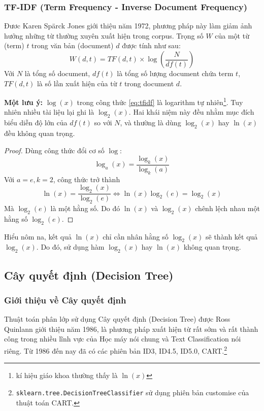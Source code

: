 \documentclass[12pt]{article}
\begin{document}
\subsubsection{TF-IDF (Term Frequency - Inverse Document Frequency)}
Đươc Karen Spärck Jones giới thiệu năm 1972\cite{Jones72astatistical}, phương pháp này làm giảm ảnh hưởng những từ thường xuyên xuất hiện trong corpus. Trọng số $W$ của một từ (term) $t$ trong văn bản (document) $d$ được tính như sau:
\begin{equation}\label{eq:tfidf}
W(d, t) = TF(d, t) \times \log\left(\frac{N}{df(t)}\right)
\end{equation}
Với $N$ là tổng số document, $df(t)$ là tổng số lượng document chứa term $t$, $TF(d, t)$ là số lần xuất hiện của từ $t$ trong document $d$.

\textbf{Một lưu ý:}\label{pr:log} $\log(x)$ trong công thức \ref{eq:tfidf} là logarithm tự nhiên\footnote{kí hiệu giáo khoa thường thấy là $\ln(x)$}. Tuy nhiên nhiều tài liệu lại ghi là $\log_2(x)$. Hai khái niệm này đều nhằm mục đích biểu diễn độ lớn của $df(t)$ so với $N$, và thường là dùng $\log_2(x)$ hay $\ln(x)$ đều không quan trọng.

\begin{proof}
Dùng công thức đổi cơ số $\log$:
\begin{equation}
\log_a(x) = \frac{\log_k(x)}{\log_k(a)}
\end{equation}
Với $a = e, k = 2$, công thức trở thành
\begin{equation}
\ln(x) = \frac{\log_2(x)}{\log_2(e)} \iff \ln(x)\log_2(e) = \log_2(x)
\end{equation}
Mà $\log_2(e)$ là một hằng số. Do đó $\ln(x)$ và $\log_2(x)$ chênh lệch nhau một hằng số $\log_2(e)$.
\end{proof}
Hiểu nôm na, kết quả $\ln(x)$ chỉ cần nhân hằng số $\log_2(x)$ sẽ thành kết quả $\log_2(x)$. Do đó, sử dụng hàm $\log_2(x)$ hay $\ln(x)$ không quan trọng.

\subsection{Cây quyết định (Decision Tree)}
\subsubsection{Giới thiệu về Cây quyết định}
Thuật toán phân lớp sử dụng Cây quyết định (Decision Tree) được Ross Quinlann giới thiệu năm 1986\cite{DBLP:journals/ml/Quinlan86}, là phương pháp xuất hiện từ rất sớm và rất thành công trong nhiều lĩnh vực của Học máy nói chung và Text Classification nói riêng. Từ 1986 đến nay đã có các phiên bản ID3, ID4.5, ID5.0, CART.\footnote{\texttt{sklearn.tree.DecisionTreeClassifier} sử dụng phiên bản customise của thuật toán CART.\cite{scikit-learn}}
\end{document}
